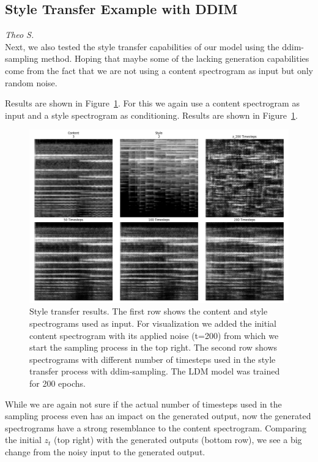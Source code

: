 \subsection{Style Transfer Example with DDIM}
\textit{Theo S.}\\
Next, we also tested the style transfer capabilities of our model using the ddim-sampling method. Hoping that maybe some of the lacking generation capabilities
come from the fact that we are not using a content spectrogram as input but only random noise.

Results are shown in Figure~\ref{fig:style_transfer_results}.
For this we again use a content spectrogram as input and a style spectrogram as conditioning.
Results are shown in Figure~\ref{fig:style_transfer_results}.

\begin{figure}[h]
    \centering
    \includegraphics[width=\textwidth]{figures/content_aware_mel_spectrograms_comparison_200ep.png}
    \caption{Style transfer results. The first row shows the content and style spectrograms used as input. 
    For visualization we added the initial content spectrogram with its applied noise (t=200) from which we start the sampling process in the top right.
    The second row shows spectrograms with different number of timesteps used in the style transfer process with ddim-sampling. 
    The LDM model was trained for 200 epochs.}
    \label{fig:style_transfer_results}
\end{figure}

While we are again not sure if the actual number of timesteps used in the sampling process even has an impact on the generated output, now the
generated spectrograms have a strong resemblance to the content spectrogram. Comparing the initial \(z_t\) (top right) with the generated outputs (bottom row),
we see a big change from the noisy input to the generated output.

